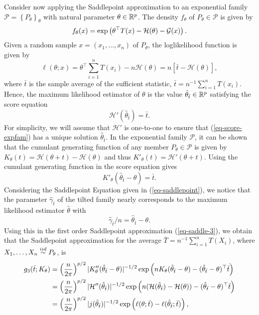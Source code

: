 Consider now applying the Saddlepoint approximation to an exponential family $\mathcal{P} = \left\{P_\theta\right\}_{\theta}$ with natural parameter $\theta \in {\mathbb{R}^p}$. The density $f_\theta$ of $P_\theta \in \mathcal{P}$ is given by
\begin{equation*}
    f_\theta(x) = \exp\left(\theta^\top T(x) - \mathcal{H}(\theta) - \mathcal{G}(x)\right).
\end{equation*}
Given a random sample $x = (x_1, \ldots, x_n)$ of $P_\theta$, the loglikelihood function is given by
\begin{equation*}
    \ell(\theta; x) = \theta^\top \sum_{i=1}^n T(x_i) - n \mathcal{H}(\theta) = n\left[\bar t - \mathcal{H}(\theta)\right],
\end{equation*}
where $\bar t$ is the sample average of the sufficient statistic, $\bar t = n^{-1}\sum_{i=1}^n T(x_i)$. Hence, the maximum likelihood estimator of $\theta$ is the value $\hat\theta_{\bar t} \in {\mathbb{R}^p}$ satisfying the score equation
\begin{equation} \label{eq-score-expfam}
    \mathcal{H}'(\hat\theta_{\bar t}) = \bar t.
\end{equation}
For simplicity, we will assume that $\mathcal{H}'$ is one-to-one to ensure that (\ref{eq-score-expfam}) has a unique solution $\hat\theta_{\bar t}$. In the exponential family $\mathcal{P}$, it can be shown that the cumulant generating function of any member $P_\theta \in \mathcal{P}$ is given by $K_\theta(t) = \mathcal{H}(\theta + t) - \mathcal{H}(\theta)$ and thus $K'_\theta(t) = \mathcal{H}'(\theta + t)$. Using the cumulant generating function in the score equation gives
\begin{equation*}
    K'_\theta(\hat\theta_{\bar t} - \theta) = \bar t.
\end{equation*}
Considering the Saddlepoint Equation given in (\ref{eq-saddlepoint}), we notice that the  parameter $\hat\gamma_{\bar t}$ of the tilted family nearly corresponds to the maximum likelihood estimator $\hat\theta$ with
\begin{equation*}
    \hat\gamma_{\bar t}/n = \hat\theta_{\bar t} - \theta.
\end{equation*}
Using this in the first order Saddlepoint approximation (\ref{eq-saddle-3}), we obtain that the Saddlepoint approximation for the average $\bar T = n^{-1}\sum_{i=1}^n T(X_i)$,  where $X_1, \ldots, X_n \stackrel{iid}{\sim} P_\theta$, is
\begin{align*}
    g_3(\bar t; K_\theta) 
    &= \left(\frac{n}{2\pi}\right)^{p/2}|K_\theta''(\hat\theta_{\bar t} - \theta)|^{-1/2} \exp\left(nK_\theta(\hat\theta_{\bar t} - \theta) - (\hat\theta_{\bar t} - \theta)^\top \bar t\right)\\
    &= \left(\frac{n}{2\pi}\right)^{p/2}|\mathcal{H}''(\hat\theta_{\bar t})|^{-1/2} \exp\left(n(\mathcal{H}(\hat\theta_{\bar t}) - \mathcal{H}(\theta)) - (\hat\theta_{\bar t} - \theta)^\top \bar t\right)\\
    &= \left(\frac{n}{2\pi}\right)^{p/2}|j(\hat\theta_{\bar t})|^{-1/2} \exp\left(\ell(\theta; \bar t) - \ell(\hat\theta_{\bar t}; \bar t)\right),
\end{align*}
